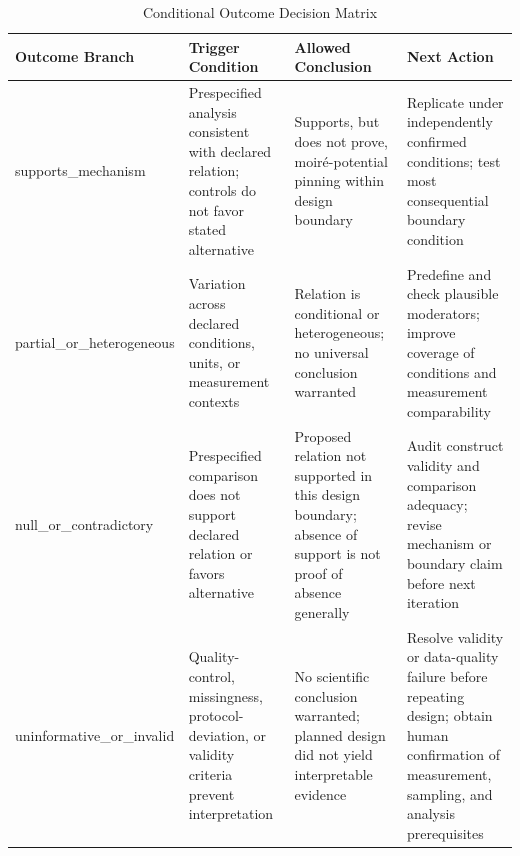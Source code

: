 \documentclass[conference]{IEEEtran}
\begin{document}
\begin{table}[htbp]
\centering
\footnotesize
\setlength{\tabcolsep}{3pt}
\renewcommand{\arraystretch}{1.12}
\caption{Conditional Outcome Decision Matrix}
\label{tab:expected-outcomes-block-3}
\begin{tabular}{|p{}|p{}|p{}|p{}|}
\hline
Outcome Branch & Trigger Condition & Allowed Conclusion & Next Action \\\hline
supports\_mechanism & Prespecified analysis consistent with declared relation; controls do not favor stated alternative & Supports, but does not prove, moiré-potential pinning within design boundary & Replicate under independently confirmed conditions; test most consequential boundary condition \\\hline
partial\_or\_heterogeneous & Variation across declared conditions, units, or measurement contexts & Relation is conditional or heterogeneous; no universal conclusion warranted & Predefine and check plausible moderators; improve coverage of conditions and measurement comparability \\\hline
null\_or\_contradictory & Prespecified comparison does not support declared relation or favors alternative & Proposed relation not supported in this design boundary; absence of support is not proof of absence generally & Audit construct validity and comparison adequacy; revise mechanism or boundary claim before next iteration \\\hline
uninformative\_or\_invalid & Quality-control, missingness, protocol-deviation, or validity criteria prevent interpretation & No scientific conclusion warranted; planned design did not yield interpretable evidence & Resolve validity or data-quality failure before repeating design; obtain human confirmation of measurement, sampling, and analysis prerequisites \\\hline
\end{tabular}
\end{table}
\end{document}
